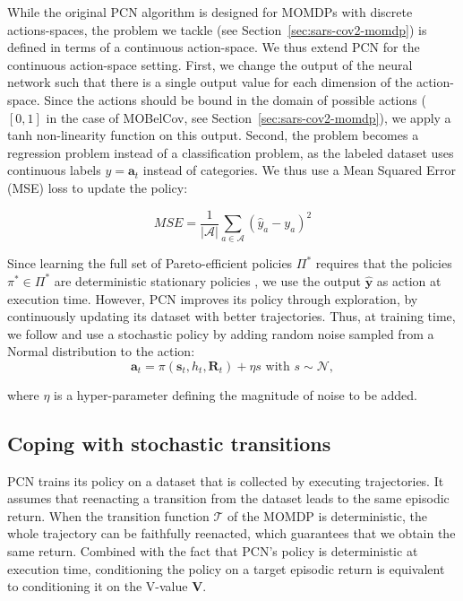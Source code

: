 \documentclass{article}
\renewcommand{\cite}[1]{\citep{#1}}
\newcommand{\mdpstate}{\mathbf{s}}
\newcommand{\momdpreturn}{\mathbf{R}}
\newcommand{\mdpaction}{\mathbf{a}}
\newcommand{\momdpname}{MOBelCov}
\begin{document}
While the original PCN algorithm is designed for MOMDPs with discrete actions-spaces, the problem we tackle (see Section~\ref{sec:sars-cov2-momdp}) is defined in terms of a continuous action-space. We thus extend PCN for the continuous action-space setting.
First, we change the output of the neural network such that there is a single output value for each dimension of the action-space. Since the actions should be bound in the domain of possible actions ($[0,1]$ in the case of \momdpname, see Section~\ref{sec:sars-cov2-momdp}), we apply a tanh non-linearity function on this output.
Second, the problem becomes a regression problem instead of a classification problem, as the labeled dataset uses continuous labels $y = \mdpaction_t$ instead of categories. We thus use a Mean Squared Error (MSE) loss to update the policy:

\begin{equation}
    MSE = \frac{1}{|\mathcal{A}|}\sum_{a \in \mathcal{A}}{(\hat{y}_a - y_a)^2}
\end{equation}

Since learning the full set of Pareto-efficient policies $\Pi^*$ requires that the policies $\pi^* \in \Pi^*$ are deterministic stationary policies \cite{roijers2013survey}, we use the output $\mathbf{\hat{y}}$ as action at execution time. However, PCN improves its policy through exploration, by continuously updating its dataset with better trajectories. Thus, at training time, we follow \cite{lillicrap2015continuous} and use a stochastic policy by adding random noise sampled from a Normal distribution to the action: 
\begin{equation}
    \mdpaction_t = \pi(\mdpstate_t, h_t, \momdpreturn_t) + \eta s \text { with } s \sim \mathcal{N},
\end{equation}

where $\eta$ is a hyper-parameter defining the magnitude of noise to be added.

\subsection{Coping with stochastic transitions}
\label{sec:pcn-stochastic}

PCN trains its policy on a dataset that is collected by executing trajectories. It assumes that reenacting a transition from the dataset leads to the same episodic return. When the transition function $\mathcal{T}$ of the MOMDP is deterministic, the whole trajectory can be faithfully reenacted, which guarantees that we obtain the same return. Combined with the fact that PCN's policy is deterministic at execution time, conditioning the policy on a target episodic return is equivalent to conditioning it on the V-value $\mathbf{V}$.
\end{document}
